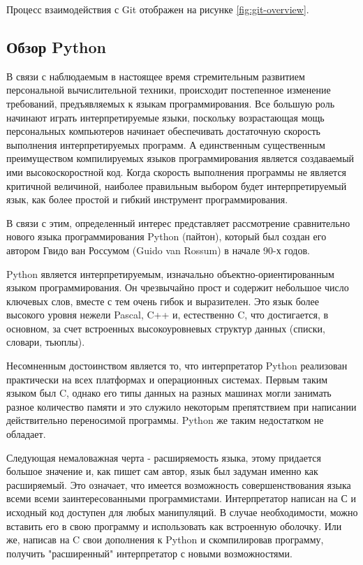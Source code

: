 Процесс взаимодействия с Git отображен на рисунке \ref{fig:git-overview}.

\subsection{Обзор Python}
\label{subsec:python-overview}

В связи с наблюдаемым в настоящее время стремительным развитием персональной вычислительной техники, происходит постепенное изменение требований,
предъявляемых к языкам программирования. Все большую роль начинают играть интерпретируемые языки, поскольку возрастающая мощь персональных компьютеров
начинает обеспечивать достаточную скорость выполнения интерпретируемых программ. А единственным существенным преимуществом компилируемых языков программирования
является создаваемый ими высокоскоростной код. Когда скорость выполнения программы не является критичной величиной, наиболее правильным выбором будет 
интерпретируемый язык, как более простой и гибкий инструмент программирования.

В связи с этим, определенный интерес представляет рассмотрение сравнительно нового языка программирования Python (пайтон),
который был создан его автором Гвидо ван Россумом (Guido van Rossum) в начале 90-х годов.

Python является интерпретируемым, изначально объектно-ориентированным языком программирования. Он чрезвычайно прост и содержит небольшое число ключевых слов, вместе с тем очень гибок и выразителен. Это язык более высокого уровня нежели Pascal, C++ и, естественно C,
что достигается, в основном, за счет встроенных высокоуровневых структур данных (списки, словари, тьюплы).

Несомненным достоинством является то, что интерпретатор Python реализован практически на всех платформах и операционных системах.
Первым таким языком был C, однако его типы данных на разных машинах могли занимать разное количество памяти и это служило некоторым
препятствием при написании действительно переносимой программы. Python же таким недостатком не обладает.

Следующая немаловажная черта - расширяемость языка, этому придается большое значение и, как пишет сам автор, язык был задуман именно как расширяемый.
Это означает, что имеется возможность совершенствования языка всеми всеми заинтересованными программистами. Интерпретатор написан на С и исходный код 
доступен для любых манипуляций. В случае необходимости, можно вставить его в свою программу и использовать как встроенную оболочку. Или же, написав на 
C свои дополнения к Python и скомпилировав программу, получить "расширенный" интерпретатор с новыми возможностями.

